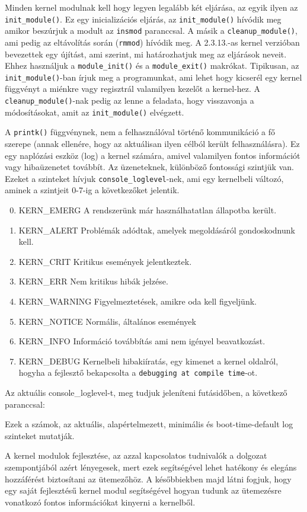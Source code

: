 Minden kernel modulnak kell hogy legyen legalább két eljárása, az egyik ilyen az \texttt{init\_module()}.
Ez egy inicializációs eljárás, az \texttt{init\_module()} hívódik meg amikor beszúrjuk a modult az \texttt{insmod} paranccsal.
A másik a \texttt{cleanup\_module()}, ami pedig az eltávolítás során (\texttt{rmmod}) hívódik meg.
A 2.3.13.-as kernel verzióban bevezettek egy újítást, ami szerint, mi határozhatjuk meg az eljárások neveit. Ehhez használjuk a \texttt{module\_init()} és a \texttt{module\_exit()} makrókat. Tipikusan, az \texttt{init\_module()}-ban írjuk meg a programunkat, ami lehet hogy kicserél egy kernel függvényt a miénkre vagy regisztrál valamilyen kezelőt a kernel-hez. A \texttt{cleanup\_module()}-nak pedig az lenne a feladata, hogy visszavonja a módosításokat, amit az \texttt{init\_module()} elvégzett.

A \texttt{printk()} függvénynek, nem a felhasználóval történő kommunikáció a fő szerepe (annak ellenére, hogy az aktuálisan ilyen célból került felhasználásra). Ez egy naplózási eszköz (log) a kernel számára, amivel valamilyen fontos információt vagy hibaüzenetet továbbít. Az üzeneteknek, különböző fontossági szintjük van. Ezeket a szinteket hívjuk \texttt{console\_loglevel}-nek, ami egy kernelbeli változó, aminek a szintjeit 0-7-ig a következőket jelentik. 
\begin{enumerate}
\setcounter{enumi}{-1}
	\item KERN\_EMERG \- A rendszerünk már használhatatlan állapotba került.
	\item KERN\_ALERT \- Problémák adódtak, amelyek megoldásáról gondoskodnunk kell.
	\item KERN\_CRIT \- Kritikus események jelentkeztek.
	\item KERN\_ERR \- Nem kritikus hibák jelzése.
	\item KERN\_WARNING	\- Figyelmeztetések, amikre oda kell figyeljünk.
	\item KERN\_NOTICE \- Normális, általános események
	\item KERN\_INFO \- Információ továbbítás ami nem igényel beavatkozást.
	\item KERN\_DEBUG \- Kernelbeli hibakiíratás, egy kimenet a kernel oldalról, hogyha a fejlesztő bekapcsolta a \texttt{debugging at compile time}-ot.
\end{enumerate}
Az aktuális console\_loglevel-t, meg tudjuk jeleníteni futásidőben, a következő paranccsal:
Ezek a számok, az aktuális, alapértelmezett, minimális és boot-time-default log szinteket mutatják.

A kernel modulok fejlesztése, az azzal kapcsolatos tudnivalók a dolgozat szempontjából azért lényegesek, mert ezek segítségével lehet hatékony és elegáns hozzáférést biztosítani az ütemezőhöz.
A későbbiekben majd látni fogjuk, hogy egy saját fejlesztésű kernel modul segítségével hogyan tudunk az ütemezésre vonatkozó fontos információkat kinyerni a kernelből.
